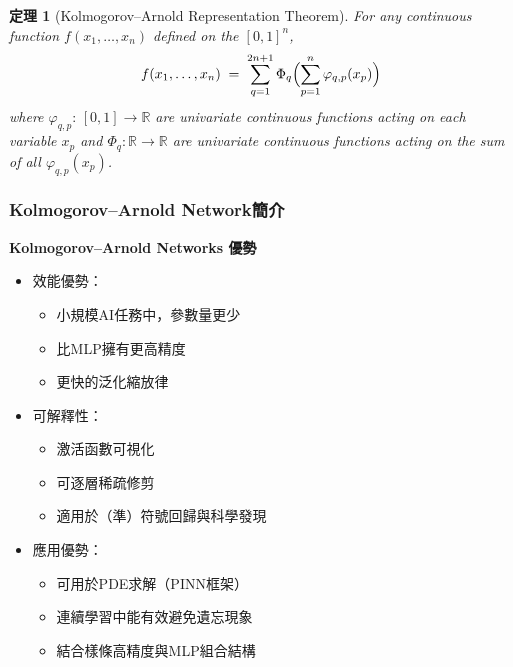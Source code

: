\documentclass{beamer}
\newtheorem{thm}{定理}
\begin{document}
\begin{frame}
\begin{thm} [Kolmogorov–Arnold Representation Theorem]
For any continuous function $f(x_1,\dots,x_n)$ defined on the $[0,1]^n$,
        \begin{equation*}\label{eq:kat}
            f(x_1,\dots,x_n)
            \;=\;
            \sum_{q=1}^{2n+1}
            \Phi_q\Bigl(\sum_{p=1}^n \varphi_{q,p}(x_p)\Bigr)
        \end{equation*}  
where $\varphi_{q,p}:\,[0,1]\to\mathbb{R}$ are univariate continuous functions acting on each variable $x_p$ and 
$\Phi_q:\mathbb{R}\to\mathbb{R}$ are univariate continuous functions acting on the sum of all $\varphi_{q,p}(x_p)$.
 \end{thm}  
\end{frame}

\begin{frame}
    \frametitle{Kolmogorov–Arnold Network簡介}
    \centering
    \textbf{Kolmogorov–Arnold Networks 優勢}\\[0.5cm]
    \begin{itemize}
        \item 效能優勢：
        \begin{itemize}
            \item 小規模AI任務中，參數量更少
            \item 比MLP擁有更高精度
            \item 更快的泛化縮放律
        \end{itemize}
        \item 可解釋性：
        \begin{itemize}
            \item 激活函數可視化
            \item 可逐層稀疏修剪
            \item 適用於（準）符號回歸與科學發現
        \end{itemize}
        \item 應用優勢：
        \begin{itemize}
            \item 可用於PDE求解（PINN框架）
            \item 連續學習中能有效避免遺忘現象
            \item 結合樣條高精度與MLP組合結構
        \end{itemize}
    \end{itemize}
\end{frame}
\end{document}
